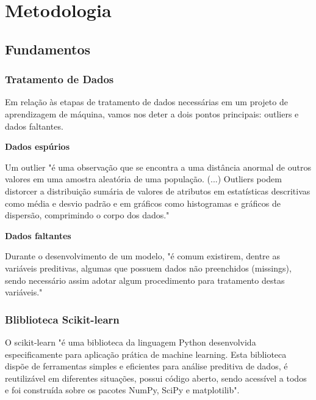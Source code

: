 

\chapter[Metodologia]{Metodologia}

    \section{Fundamentos}

        \subsection{Tratamento de Dados}
            Em relação às etapas de tratamento de dados necessárias em um projeto de aprendizagem de máquina, vamos nos deter a dois pontos principais: outliers e dados faltantes.\newline 

            \textbf{Dados espúrios}\par
            Um outlier "é uma observação que se encontra a uma distância anormal de outros valores em uma amostra aleatória de uma população. (...) Outliers podem distorcer a distribuição sumária de valores de atributos em estatísticas descritivas como média e desvio padrão e em gráficos como histogramas e gráficos de dispersão, comprimindo o corpo dos dados." \cite{portal2018}\newline

            \textbf{Dados faltantes}\par
            Durante o desenvolvimento de um modelo, "é comum existirem, dentre as variáveis preditivas, algumas que possuem dados não preenchidos (missings), sendo necessário assim adotar algum procedimento para tratamento destas variáveis." \cite{assuncao2012}\newline

	    \subsection{Bliblioteca Scikit-learn}
	    O scikit-learn "é uma biblioteca da linguagem Python desenvolvida especificamente para aplicação prática de machine learning. Esta biblioteca dispõe de ferramentas simples e eficientes para análise preditiva de dados, é reutilizável em diferentes situações, possui código aberto, sendo acessível a todos e foi construída sobre os pacotes NumPy, SciPy e matplotilib". \cite{didatica2020}

